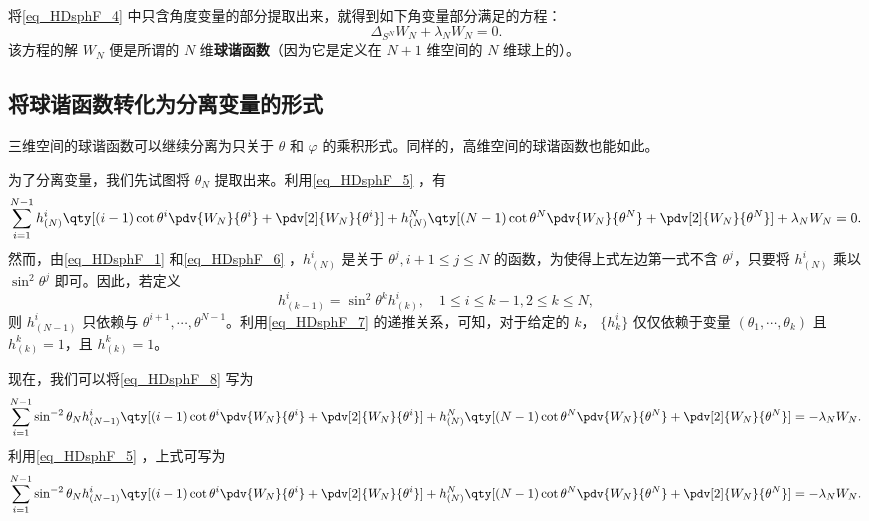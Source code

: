 将\autoref{eq_HDsphF_4} 中只含角度变量的部分提取出来，就得到如下角变量部分满足的方程：
\begin{equation}
\Delta_{S^N}W_N+\lambda_N W_N=0.~
\end{equation}
该方程的解 $W_N$ 便是所谓的 $N$ 维\textbf{球谐函数}（因为它是定义在 $N+1$ 维空间的 $N$ 维球上的）。

\subsection{将球谐函数转化为分离变量的形式}
三维空间的球谐函数可以继续分离为只关于 $\theta$ 和 $\varphi$ 的乘积形式。同样的，高维空间的球谐函数也能如此。

为了分离变量，我们先试图将 $\theta_N$ 提取出来。利用\autoref{eq_HDsphF_5} ，有
\begin{equation}\label{eq_HDsphF_8}
\sum_{i=1}^{N-1} h^{i}_{(N)}\qty[(i-1)\cot\theta^i\pdv{W_N}{\theta^i}+\pdv[2]{W_N}{\theta^i}]+h^{N}_{(N)}\qty[(N-1)\cot\theta^N\pdv{W_N}{\theta^N}+\pdv[2]{W_N}{\theta^N}]+\lambda_N W_N=0.~
\end{equation}
然而，由\autoref{eq_HDsphF_1} 和\autoref{eq_HDsphF_6} ，$h^i_{(N)}$ 是关于 $\theta^j,i+1\leq j\leq N$ 的函数，为使得上式左边第一式不含 $\theta^j$，只要将 $h^i_{(N)}$ 乘以 $\sin^2\theta^j$ 即可。因此，若定义
\begin{equation}\label{eq_HDsphF_7}
h^{i}_{(k-1)}=\sin^2\theta^k h^i_{(k)},\quad 1\leq i\leq k-1,2\leq k\leq N,~
\end{equation}
则 $h^i_{(N-1)}$ 只依赖与 $\theta ^{i+1},\cdots,\theta^{N-1}$。利用\autoref{eq_HDsphF_7} 的递推关系，可知，对于给定的 $k$， $\{h^i_{k}\}$ 仅仅依赖于变量 $(\theta_1,\cdots,\theta_k)$ 且 $h^k_{(k)}=1$，且 $h^k_{(k)}=1$。

现在，我们可以将\autoref{eq_HDsphF_8} 写为
\begin{equation}
\sum_{i=1}^{N-1} \sin^{-2}\theta_N h^{i}_{(N-1)}\qty[(i-1)\cot\theta^i\pdv{W_N}{\theta^i}+\pdv[2]{W_N}{\theta^i}]+h^{N}_{(N)}\qty[(N-1)\cot\theta^N\pdv{W_N}{\theta^N}+\pdv[2]{W_N}{\theta^N}]=-\lambda_N W_N.~
\end{equation}
利用\autoref{eq_HDsphF_5} ，上式可写为
\begin{equation}
\sum_{i=1}^{N-1} \sin^{-2}\theta_N h^{i}_{(N-1)}\qty[(i-1)\cot\theta^i\pdv{W_N}{\theta^i}+\pdv[2]{W_N}{\theta^i}]+h^{N}_{(N)}\qty[(N-1)\cot\theta^N\pdv{W_N}{\theta^N}+\pdv[2]{W_N}{\theta^N}]=-\lambda_N W_N.~
\end{equation}











